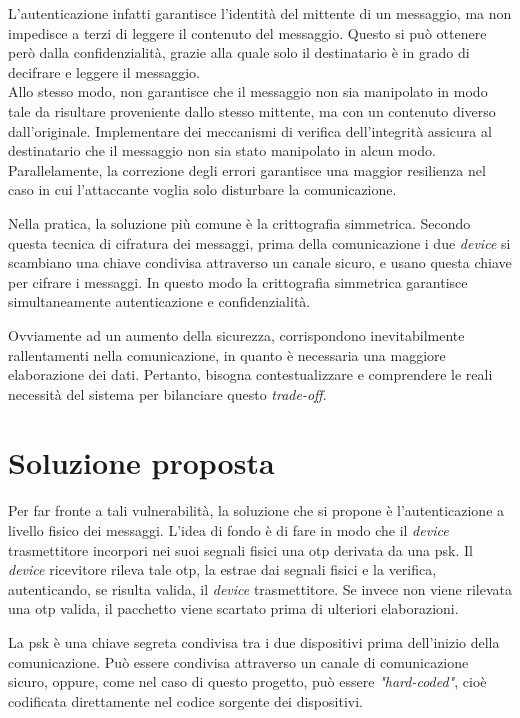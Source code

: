 L'autenticazione infatti garantisce l'identità del mittente di un messaggio, ma non impedisce a terzi di leggere il contenuto del messaggio. Questo si può ottenere però dalla confidenzialità, grazie alla quale solo il destinatario è in grado di decifrare e leggere il messaggio.\\
Allo stesso modo, non garantisce che il messaggio non sia manipolato in modo tale da risultare proveniente dallo stesso mittente, ma con un contenuto diverso dall'originale. Implementare dei meccanismi di verifica dell'integrità assicura al destinatario che il messaggio non sia stato manipolato in alcun modo.\\
Parallelamente, la correzione degli errori garantisce una maggior resilienza nel caso in cui l'attaccante voglia solo disturbare la comunicazione.

Nella pratica, la soluzione più comune è la crittografia simmetrica. Secondo questa tecnica di cifratura dei messaggi, prima della comunicazione i due \textit{device} si scambiano una chiave condivisa attraverso un canale sicuro, e usano questa chiave per cifrare i messaggi. In questo modo la crittografia simmetrica garantisce simultaneamente autenticazione e confidenzialità.

Ovviamente ad un aumento della sicurezza, corrispondono inevitabilmente rallentamenti nella comunicazione, in quanto è necessaria una maggiore elaborazione dei dati. Pertanto, bisogna contestualizzare e comprendere le reali necessità del sistema per bilanciare questo \textit{trade-off}.

\section{Soluzione proposta}

Per far fronte a tali vulnerabilità, la soluzione che si propone è l'autenticazione a livello fisico dei messaggi. L'idea di fondo è di fare in modo che il \textit{device} trasmettitore incorpori nei suoi segnali fisici una \gls{otp} derivata da una \gls{psk}\glsfirstoccur. Il \textit{device} ricevitore rileva tale \gls{otp}, la estrae dai segnali fisici e la verifica, autenticando, se risulta valida, il \textit{device} trasmettitore. Se invece non viene rilevata una \gls{otp} valida, il pacchetto viene scartato prima di ulteriori elaborazioni.

La \gls{psk} è una chiave segreta condivisa tra i due dispositivi prima dell'inizio della comunicazione. Può essere condivisa attraverso un canale di comunicazione sicuro, oppure, come nel caso di questo progetto, può essere \textit{"hard-coded"}, cioè codificata direttamente nel codice sorgente dei dispositivi.


